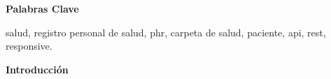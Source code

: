 \documentclass[a4paper,twocolumn,12pt]{article}
\newcommand{\chico}{\fontsize{10pt}{5em}\selectfont}
\begin{document}
{%
}

\vspace{3mm}
{\chico \textbf{Palabras Clave}}

{\chico
salud, registro personal de salud, phr, carpeta de salud, paciente, api, rest, responsive. 
}

\vspace{3mm}
\textbf{Introducción}
\end{document}
